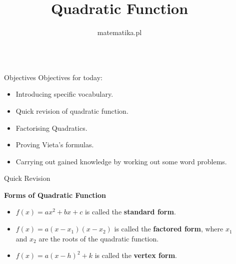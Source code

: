 \documentclass[final]{beamer}
\title{Quadratic Function} %
\author{matematika.pl} %
\institute{2015} %
\newlength{\sepwid}
\newlength{\onecolwid}
\begin{document}

\setlength{\belowcaptionskip}{2ex} %
\setlength\belowdisplayshortskip{2ex} %

\begin{frame}[t] %

\begin{columns}[t] %

\begin{column}{\sepwid}\end{column} %

\begin{column}{\onecolwid} %


\begin{alertblock}{Objectives}
Objectives for today:
\begin{itemize}
\item Introducing specific vocabulary.
\item Quick revision of quadratic function.
\item Factorising Quadratics.
\item Proving Vieta's formulas.
\item Carrying out gained knowledge by working out some word problems.
\end{itemize}

\end{alertblock}


\begin{block}{Quick Revision}

\textbf{Forms of Quadratic Function}
\begin{itemize}
\item $f(x) = ax^2+bx+c$ is called the \textbf{standard form}.
\item $f(x) = a(x-x_1)(x-x_2)$ is called the \textbf{factored form}, where $x_1$ and $x_2$ are the roots of the quadratic function.
\item $f(x) = a(x-h)^2+k$ is called the \textbf{vertex form}.
\end{itemize}


\end{block}
\end{column}
\end{columns}
\end{frame}
\end{document}
